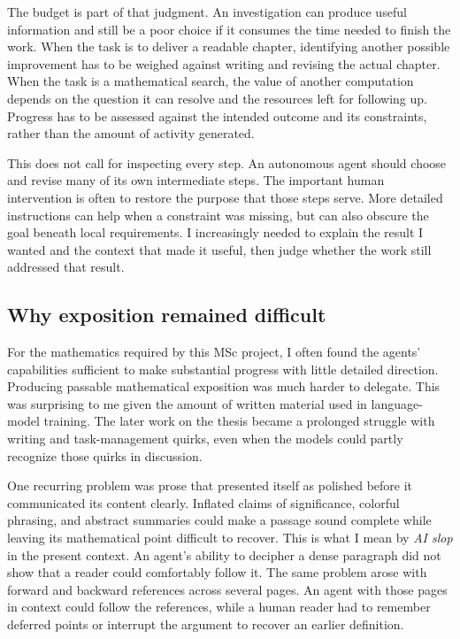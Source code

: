 The budget is part of that judgment. An investigation can produce useful
information and still be a poor choice if it consumes the time needed to
finish the work. When the task is to deliver a readable chapter, identifying
another possible improvement has to be weighed against writing and revising
the actual chapter. When the task is a mathematical search, the value of
another computation depends on the question it can resolve and the resources
left for following up. Progress has to be assessed against the intended
outcome and its constraints, rather than the amount of activity generated.

This does not call for inspecting every step. An autonomous agent should
choose and revise many of its own intermediate steps. The important human
intervention is often to restore the purpose that those steps serve. More
detailed instructions can help when a constraint was missing, but can also
obscure the goal beneath local requirements. I increasingly needed to explain
the result I wanted and the context that made it useful, then judge whether
the work still addressed that result.

\subsection{Why exposition remained difficult}

For the mathematics required by this MSc project, I often found the agents'
capabilities sufficient to make substantial progress with little detailed
direction. Producing passable mathematical exposition was much harder to
delegate. This was surprising to me given the amount of written material
used in language-model training. The later work on the thesis became a
prolonged struggle with writing and task-management quirks, even when the
models could partly recognize those quirks in discussion.

One recurring problem was prose that presented itself as polished before it
communicated its content clearly. Inflated claims of significance, colorful
phrasing, and abstract summaries could make a passage sound complete while
leaving its mathematical point difficult to recover. This is what I mean by
\emph{AI slop} in the present context. An agent's ability to decipher a dense
paragraph did not show that a reader could comfortably follow it. The same
problem arose with forward and backward references across several pages.
An agent with those pages in context could follow the references, while a
human reader had to remember deferred points or interrupt the argument to
recover an earlier definition.

